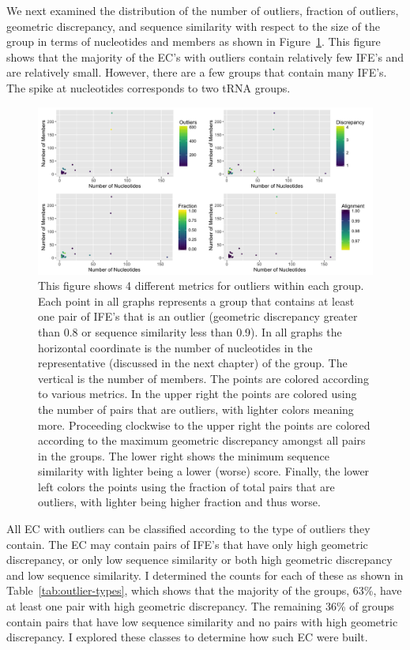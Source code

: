 We next examined the distribution of the number of outliers, fraction of
outliers, geometric discrepancy, and sequence similarity with respect to the
size of the group in terms of nucleotides and members as shown in
Figure~\ref{fig:outlier-detail}. This figure shows that the majority of the EC's
with outliers contain relatively few IFE's and are relatively small. However,
there are a few groups that contain many IFE's. The spike at 
nucleotides corresponds to two tRNA groups.

\begin{figure}[h]
  \includegraphics[width=\textwidth]{chapter-3/figs/outlier-details}
  \caption{This figure shows 4 different metrics for outliers within each group.
    Each point in all graphs represents a group that contains at least one pair
    of IFE's that is an outlier (geometric discrepancy greater than 0.8 or sequence
    similarity less than 0.9). In all graphs the horizontal coordinate is the
    number of nucleotides in the representative (discussed in the next chapter)
    of the group. The vertical is the number of members. The points are colored
    according to various metrics. In the upper right the points are colored
    using the number of pairs that are outliers, with lighter colors meaning
    more. Proceeding clockwise to the upper right the points are colored
    according to the maximum geometric discrepancy amongst all pairs in the groups.
    The lower right shows the minimum sequence similarity with lighter being a
    lower (worse) score. Finally, the lower left colors the points using the
    fraction of total pairs that are outliers, with lighter being higher
  fraction and thus worse.}
  \label{fig:outlier-detail}
\end{figure}

All EC with outliers can be classified according to the type of outliers they
contain. The EC may contain pairs of IFE's that have only high geometric
discrepancy, or only low sequence similarity or both high geometric discrepancy
and low sequence similarity. I determined the counts for each of these as shown
in Table~\ref{tab:outlier-types}, which shows that the majority of the groups,
63\%, have at least one pair with high geometric discrepancy. The remaining 36\%
of groups contain pairs that have low sequence similarity and no pairs with high
geometric discrepancy. I explored these classes to determine how such EC were
built.

